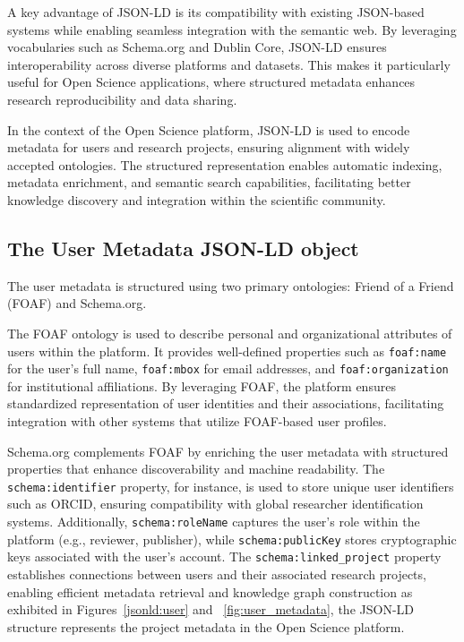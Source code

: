 \documentclass[final]{rc-book-2.14}
\begin{document}
A key advantage of JSON-LD is its compatibility with existing JSON-based systems while enabling seamless integration with the semantic web. By leveraging vocabularies such as Schema.org and Dublin Core, JSON-LD ensures interoperability across diverse platforms and datasets. This makes it particularly useful for Open Science applications, where structured metadata enhances research reproducibility and data sharing.

In the context of the Open Science platform, JSON-LD is used to encode metadata for users and research projects, ensuring alignment with widely accepted ontologies. The structured representation enables automatic indexing, metadata enrichment, and semantic search capabilities, facilitating better knowledge discovery and integration within the scientific community.


\subsection{The User Metadata JSON-LD object}

The user metadata is structured using two primary ontologies: Friend of a Friend (FOAF) and Schema.org.

The FOAF ontology is used to describe personal and organizational attributes of users within the platform. It provides well-defined properties such as \texttt{foaf:name} for the user’s full name, \texttt{foaf:mbox} for email addresses, and \texttt{foaf:organization} for institutional affiliations. By leveraging FOAF, the platform ensures standardized representation of user identities and their associations, facilitating integration with other systems that utilize FOAF-based user profiles.

Schema.org complements FOAF by enriching the user metadata with structured properties that enhance discoverability and machine readability. The \texttt{schema:identifier} property, for instance, is used to store unique user identifiers such as ORCID, ensuring compatibility with global researcher identification systems. Additionally, \texttt{schema:roleName} captures the user’s role within the platform (e.g., reviewer, publisher), while \texttt{schema:publicKey} stores cryptographic keys associated with the user’s account. The \texttt{schema:linked\_project} property establishes connections between users and their associated research projects, enabling efficient metadata retrieval and knowledge graph construction as exhibited in Figures~\ref{jsonld:user} and ~\ref{fig:user_metadata}, the JSON-LD structure represents the project metadata in the Open Science platform.
\end{document}

